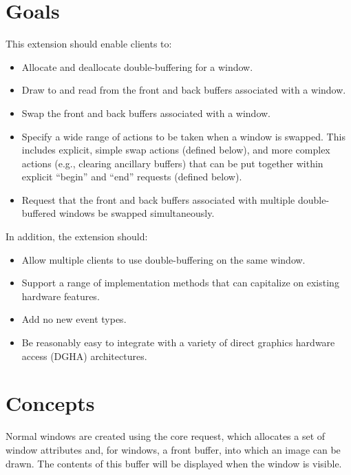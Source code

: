 \section{Goals}

This extension should enable clients to:
\begin{itemize}

\item Allocate and deallocate double-buffering for a window.

\item Draw to and read from the front and back buffers associated with
a window.

\item Swap the front and back buffers associated with a window.

\item Specify a wide range of actions to be taken when a window is
swapped.  This includes explicit, simple swap actions (defined
below), and more complex actions (e.g., clearing ancillary buffers)
that can be put together within explicit ``begin'' and ``end''
requests (defined below).

\item Request that the front and back buffers associated with multiple
double-buffered windows be swapped simultaneously.

\end{itemize}

In addition, the extension should:

\begin{itemize}

\item Allow multiple clients to use double-buffering on the same window.

\item Support a range of implementation methods that can capitalize on
existing hardware features.

\item Add no new event types.

\item Be reasonably easy to integrate with a variety of direct graphics
hardware access (DGHA) architectures.
\end{itemize}

\section{Concepts}

Normal windows are created using the core 
request, which allocates a set of window attributes and, for
 windows, a front buffer,
into which an image can be drawn.
The contents of this buffer will be displayed when the window is
visible.

